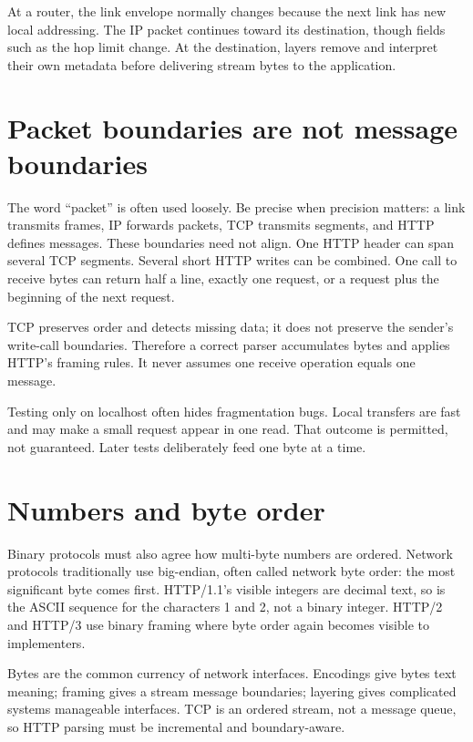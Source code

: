 At a router, the link envelope normally changes because the next link has new
local addressing. The IP packet continues toward its destination, though fields
such as the hop limit change. At the destination, layers remove and interpret
their own metadata before delivering stream bytes to the application.

\section{Packet boundaries are not message boundaries}

The word ``packet'' is often used loosely. Be precise when precision matters:
a link transmits frames, IP forwards packets, TCP transmits segments, and HTTP
defines messages. These boundaries need not align. One HTTP header can span
several TCP segments. Several short HTTP writes can be combined. One call to
receive bytes can return half a line, exactly one request, or a request plus the
beginning of the next request.

TCP preserves order and detects missing data; it does not preserve the sender's
write-call boundaries. Therefore a correct parser accumulates bytes and applies
HTTP's framing rules. It never assumes one receive operation equals one message.

\begin{pitfall}
Testing only on localhost often hides fragmentation bugs. Local transfers are
fast and may make a small request appear in one read. That outcome is permitted,
not guaranteed. Later tests deliberately feed one byte at a time.
\end{pitfall}

\section{Numbers and byte order}

Binary protocols must also agree how multi-byte numbers are ordered. Network
protocols traditionally use big-endian, often called network byte order: the
most significant byte comes first. HTTP/1.1's visible integers are decimal text,
so  is the ASCII sequence for the characters 1 and 2,
not a binary integer. HTTP/2 and HTTP/3 use binary framing where byte order again
becomes visible to implementers.

\summarytitle

Bytes are the common currency of network interfaces. Encodings give bytes text
meaning; framing gives a stream message boundaries; layering gives complicated
systems manageable interfaces. TCP is an ordered stream, not a message queue,
so HTTP parsing must be incremental and boundary-aware.

